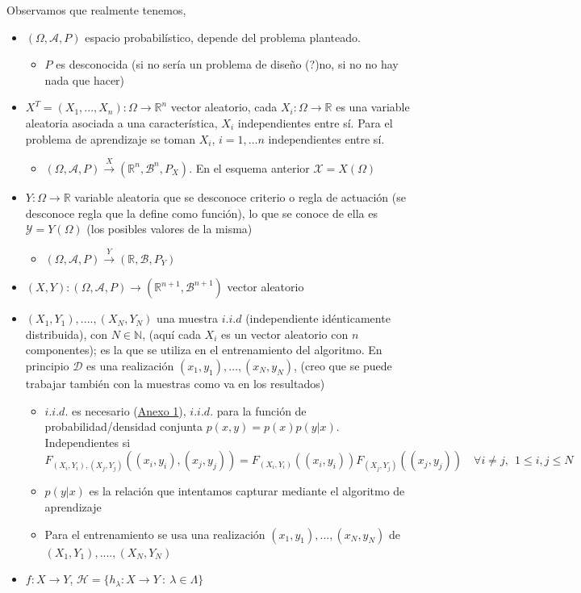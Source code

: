 \documentclass[11pt,a4paper]{article}
\theoremstyle{definition}
\newcommand{\R}{\mathbb{R}}
\newcommand{\N}{\mathbb{N}}
\begin{document}
	Observamos que realmente tenemos,
	\begin{itemize}
		\item $(\Omega, \mathcal{A}, P)$ espacio probabilístico, depende del problema planteado.
		\begin{itemize}
			\item $P$ es desconocida (si no sería un problema de diseño (?)no, si no no hay nada que hacer)
		\end{itemize}
		\item $X^T=(X_1,...,X_n)\colon \Omega \to \R^n$ vector aleatorio, cada $X_i\colon \Omega \to \R$ es una variable aleatoria asociada a una característica, $X_i$ independientes entre sí. Para el problema de aprendizaje se toman $X_i$, $i=1,\ldots n$ independientes entre sí.
		\begin{itemize}
			\item $(\Omega, \mathcal{A}, P) \stackrel{X}{\to} (\R^n, \mathcal{B}^n, P_X)$.  En el esquema anterior $\mathcal{X}=X(\Omega)$	
		\end{itemize}
		\item $Y\colon \Omega \to \R$ variable aleatoria que se desconoce criterio o regla de actuación (se desconoce regla que la define como función), lo que se conoce de ella es $\mathcal{Y}=Y(\Omega)$ (los posibles valores de la misma)
		\begin{itemize}
			\item $(\Omega, \mathcal{A},P) \stackrel{Y}{\to} (\R, \mathcal{B}, P_Y)$
		\end{itemize}
		\item $(X,Y)\colon (\Omega,\mathcal{A}, P) \to (\R^{n+1},\mathcal{B}^{n+1})$ vector aleatorio
		\item $(X_1,Y_1), ...., (X_N,Y_N)$ una muestra $i.i.d$ (independiente idénticamente distribuida), con $N\in \N$, (aquí cada $X_i$ es un vector aleatorio con $n$ componentes); es la que se utiliza en el entrenamiento del algoritmo. En principio $\mathcal{D}$ es una realización $(x_1,y_1),\ldots, (x_N,y_N)$, (creo que se puede trabajar también con la muestras como va en los resultados)
		\begin{itemize}
		\item $i.i.d.$ es necesario (\hyperref[sec:anexo1]{Anexo 1}), $i.i.d.$ para la función de probabilidad/densidad conjunta $p(x,y)=p(x)p(y|x)$. Independientes si
		$$F_{(X_i,Y_i),(X_j,Y_j)}((x_i,y_i),(x_j,y_j))=F_{(X_i,Y_i)}((x_i,y_i))F_{(X_j,Y_j)}((x_j,y_j))\quad \forall i\neq j, \ \ 1\leq i,j \leq N$$
		\item $p(y|x)$ es la relación que intentamos capturar mediante el algoritmo de aprendizaje
		\item Para el entrenamiento se usa una realización $(x_1,y_1),...,(x_N,y_N)$ de $(X_1,Y_1), ...., (X_N,Y_N)$
		\end{itemize}
		\item $f\colon X \to Y$, $\mathcal{H}=\{h_\lambda \colon X \to Y \ : \ \lambda \in \Lambda\}$
	
	\end{itemize}
	
\end{document}
